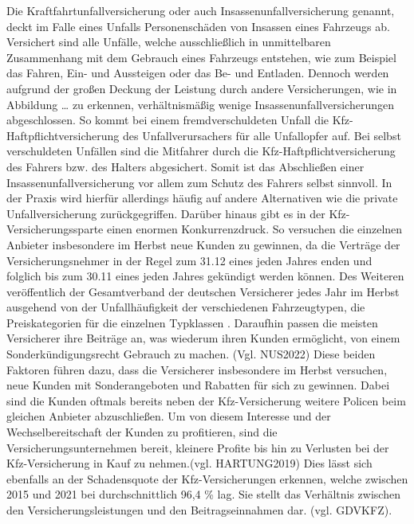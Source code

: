 Die Kraftfahrtunfallversicherung oder auch Insassenunfallversicherung genannt, deckt im Falle eines Unfalls Personenschäden von Insassen eines Fahrzeugs ab. Versichert sind alle Unfälle, welche ausschließlich in unmittelbaren Zusammenhang mit dem Gebrauch eines Fahrzeugs entstehen, wie zum Beispiel das Fahren, Ein- und Aussteigen oder das Be- und Entladen.\autocite[Vgl.][S. 6f]{STADLER1998} Dennoch werden aufgrund der großen Deckung der Leistung durch andere Versicherungen, wie in Abbildung … zu erkennen, verhältnismäßig wenige Insassenunfallversicherungen abgeschlossen. So kommt bei einem fremdverschuldeten Unfall die Kfz-Haftpflichtversicherung des Unfallverursachers für alle Unfallopfer auf. Bei selbst verschuldeten Unfällen sind die Mitfahrer durch die Kfz-Haftpflichtversicherung des Fahrers bzw. des Halters abgesichert. Somit ist das Abschließen einer Insassenunfallversicherung vor allem zum Schutz des Fahrers selbst sinnvoll.\autocite[Vgl.][S. 173f]{LAMMERS2006} In der Praxis wird hierfür allerdings häufig auf andere Alternativen wie die private Unfallversicherung zurückgegriffen.\autocite[Vgl.][]{GRATZLA2018}  
Darüber hinaus gibt es in der Kfz-Versicherungssparte einen enormen Konkurrenzdruck. So versuchen die einzelnen Anbieter insbesondere im Herbst neue Kunden zu gewinnen, da die Verträge der Versicherungsnehmer in der Regel zum 31.12 eines jeden Jahres enden und folglich bis zum 30.11 eines jeden Jahres gekündigt werden können.\autocite[Vgl.][]{WARENTEST2022} Des Weiteren veröffentlich der Gesamtverband der deutschen Versicherer jedes Jahr im Herbst ausgehend von der Unfallhäufigkeit der verschiedenen Fahrzeugtypen, die Preiskategorien für die einzelnen Typklassen . Daraufhin passen die meisten Versicherer ihre Beiträge an, was wiederum ihren Kunden ermöglicht, von einem Sonderkündigungsrecht Gebrauch zu machen.\autocite[Vgl.][]{NUS2022} (Vgl. NUS2022) Diese beiden Faktoren führen dazu, dass die Versicherer insbesondere im Herbst versuchen, neue Kunden mit Sonderangeboten und Rabatten für sich zu gewinnen. 
Dabei sind die Kunden oftmals bereits neben der Kfz-Versicherung weitere Policen beim gleichen Anbieter abzuschließen. Um von diesem Interesse und der Wechselbereitschaft der Kunden zu profitieren, sind die Versicherungsunternehmen bereit, kleinere Profite bis hin zu Verlusten bei der Kfz-Versicherung in Kauf zu nehmen.(vgl. HARTUNG2019) Dies lässt sich ebenfalls an der Schadensquote der Kfz-Versicherungen erkennen, welche zwischen 2015 und 2021 bei durchschnittlich 96,4 \% lag. Sie stellt das Verhältnis zwischen den Versicherungsleistungen und den Beitragseinnahmen dar. (vgl. GDVKFZ).  



\newpage
